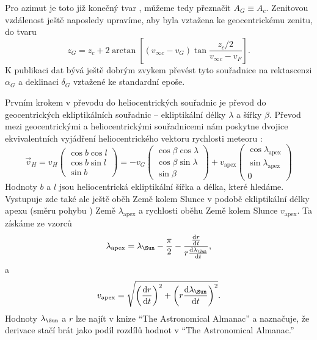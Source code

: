 \smallskip

Pro azimut je toto již konečný tvar \cite{ceplecha}, můžeme tedy přeznačit $A_G\equiv A_c$. Zenitovou vzdálenost ještě naposledy upravíme, aby byla vztažena ke geocentrickému zenitu, do tvaru \cite{ceplecha}
\begin{equation}
    z_G=z_c+2\arctan{\left[ (v_{\infty c}-v_G) \tan{\frac{z_c/2}{v_{\infty c} - v_F}}\right]}\text{.}
\end{equation}
K publikaci dat bývá ještě dobrým zvykem převést tyto souřadnice na rektascenzi $\alpha_G$ a deklinaci $\delta_G$ vztažené ke standardní epoše.

\medskip

Prvním krokem v převodu do heliocentrických souřadnic je převod do geocentrických ekliptikálních souřadnic -- ekliptikální délky $\lambda$ a šířky $\beta$. Převod mezi geocentrickými a heliocentrickými souřadnicemi nám poskytne dvojice ekvivalentních vyjádření heliocentrického vektoru rychlosti meteoru \cite{ceplecha}:
\begin{equation}
    \vec{v}_H=v_H\begin{pmatrix}
        \cos{b}\cos{l} \\
        \cos{b}\sin{l} \\
        \sin{b}
    \end{pmatrix}=-v_G\begin{pmatrix}
        \cos{\beta}\cos{\lambda} \\
        \cos{\beta}\sin{\lambda} \\
        \sin{\beta}
    \end{pmatrix}+v_\text{apex}\begin{pmatrix}
        \cos{\lambda_\text{apex}} \\
        \sin{\lambda_\text{apex}} \\
        0
    \end{pmatrix}
\end{equation}
Hodnoty $b$ a $l$ jsou heliocentrická ekliptikální šířka a délka, které hledáme. Vystupuje zde také ale ještě oběh Země kolem Slunce v podobě ekliptikální délky apexu (směru pohybu \cite{astro}) Země $\lambda_\text{apex}$ a rychlosti oběhu Země kolem Slunce $v_\text{apex}$. Ta získáme ze vzorců \cite{ceplecha}
\begin{equation}
    \lambda_\text{apex}=\lambda_\text{\Sun}-\frac{\pi}{2}-\frac{\frac{\text{d}r}{\text{d}t}}{r\frac{\text{d}\lambda_\text{\Sun}}{\text{d}t}}\text{,}
\end{equation}
a
\begin{equation}
    v_\text{apex}=\sqrt{
        \left( \frac{\text{d}r}{\text{d}t} \right)^2+
        \left( r\frac{\text{d}\lambda_\text{\Sun}}{\text{d}t} \right)^2
    }\text{.}
\end{equation}
Hodnoty $\lambda_\text{\Sun}$ a $r$ lze najít v knize "`The Astronomical Almanac"' a \cite{ceplecha} naznačuje, že derivace stačí brát jako podíl rozdílů hodnot v "`The Astronomical Almanac."'

